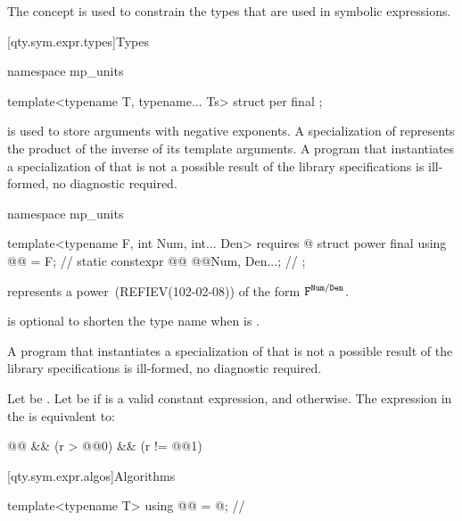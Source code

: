 \pnum
The concept 
is used to constrain the types
that are used in symbolic expressions.

[qty.sym.expr.types]{Types}

\begin{codeblock}
namespace mp_units {

template<typename T, typename... Ts>
struct per final {};

}
\end{codeblock}

\pnum
{} is used to store arguments with negative exponents.
A specialization of 
represents the product of the inverse of its template arguments.
A program that instantiates a specialization of 
that is not a possible result of the library specifications
is ill-formed, no diagnostic required.

\begin{codeblock}
namespace mp_units {

template<typename F, int Num, int... Den>
  requires @\seebelownc@
struct power final {
  using @@ = F;                              // \expos
  static constexpr @@ @@{Num, Den...};  // \expos
};

}
\end{codeblock}

\pnum
{} represents a power~(REFIEV(102-02-08))
of the form $\texttt{\protect F}^{\texttt{\protect Num}/\texttt{\protect Den}}$.
\begin{note}
 is optional to shorten the type name when  is .
\end{note}
A program that instantiates a specialization of 
that is not a possible result of the library specifications
is ill-formed, no diagnostic required.

\pnum
Let  be .
Let  be
 if  is a valid constant expression, and
 otherwise.
The expression in the  is equivalent to:
\begin{codeblock}
@@ && (r > @@{0}) && (r != @@{1})
\end{codeblock}

[qty.sym.expr.algos]{Algorithms}

\begin{codeblock}
template<typename T>
using @@ = @\seebelownc@;  // \expos
\end{codeblock}

